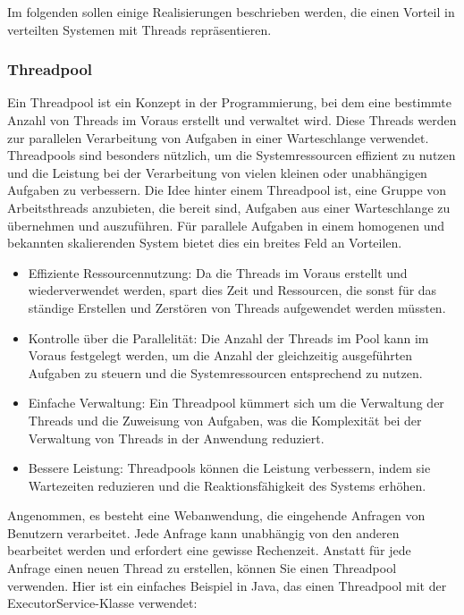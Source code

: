 Im folgenden sollen einige Realisierungen beschrieben werden, die einen Vorteil in verteilten Systemen mit Threads repräsentieren. 
\subsubsection{Threadpool}
Ein Threadpool ist ein Konzept in der Programmierung, bei dem eine bestimmte Anzahl von Threads im Voraus erstellt und verwaltet wird. Diese Threads werden zur parallelen Verarbeitung von Aufgaben in einer Warteschlange verwendet. Threadpools sind besonders nützlich, um die Systemressourcen effizient zu nutzen und die Leistung bei der Verarbeitung von vielen kleinen oder unabhängigen Aufgaben zu verbessern.
Die Idee hinter einem Threadpool ist, eine Gruppe von Arbeitsthreads anzubieten, die bereit sind, Aufgaben aus einer Warteschlange zu übernehmen und auszuführen. Für parallele Aufgaben in einem homogenen und bekannten skalierenden System bietet dies ein breites Feld an Vorteilen. 
\begin{itemize}
\item Effiziente Ressourcennutzung: Da die Threads im Voraus erstellt und wiederverwendet werden, spart dies Zeit und Ressourcen, die sonst für das ständige Erstellen und Zerstören von Threads aufgewendet werden müssten.
\item Kontrolle über die Parallelität: Die Anzahl der Threads im Pool kann im Voraus festgelegt werden, um die Anzahl der gleichzeitig ausgeführten Aufgaben zu steuern und die Systemressourcen entsprechend zu nutzen.
\item Einfache Verwaltung: Ein Threadpool kümmert sich um die Verwaltung der Threads und die Zuweisung von Aufgaben, was die Komplexität bei der Verwaltung von Threads in der Anwendung reduziert.
\item Bessere Leistung: Threadpools können die Leistung verbessern, indem sie Wartezeiten reduzieren und die Reaktionsfähigkeit des Systems erhöhen.
\end{itemize}
Angenommen, es besteht eine Webanwendung, die eingehende Anfragen von Benutzern verarbeitet. Jede Anfrage kann unabhängig von den anderen bearbeitet werden und erfordert eine gewisse Rechenzeit. Anstatt für jede Anfrage einen neuen Thread zu erstellen, können Sie einen Threadpool verwenden. Hier ist ein einfaches Beispiel in Java, das einen Threadpool mit der ExecutorService-Klasse verwendet:

